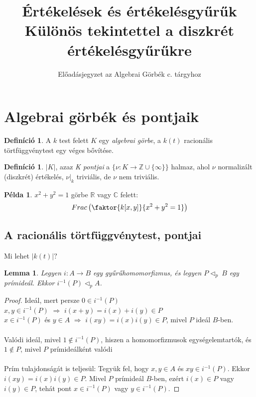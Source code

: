 \documentclass[11pt,a4paper]{article}
\title{Értékelések és értékelésgyűrűk\\
\large Különös tekintettel a diszkrét értékelésgyűrűkre}
\author{Előadásjegyzet az Algebrai Görbék c. tárgyhoz}
\date{}
\newtheorem{lemma}[tetel]{Lemma}
\theoremstyle{definition}
\newtheorem{definicio}[tetel]{Definíció}
\newtheorem{pelda}[tetel]{Példa}
\begin{document}
\section{Algebrai görbék és pontjaik}

\begin{definicio}
    A $k$ test felett $K$ egy \emph{algebrai görbe}, a $k(t)$ racionális törtfüggvénytest egy véges bővítése.
\end{definicio}

\begin{definicio}
   $|K|$, azaz \emph{K pontjai} a $\{ \nu : K \rightarrow \mathbb{Z} \cup \{\infty\}\}$ halmaz, ahol $\nu$ normalizált (diszkrét) értékelés, $\nu|_k$ triviális, de $\nu$ nem triviális.
\end{definicio}

\begin{pelda}
    $x^2+y^2=1$ görbe $\mathbb{R}$ vagy $\mathbb{C}$ felett:
    $$Frac\left (\faktor {k[x,y]}{x^2+y^2=1}\right)$$
\end{pelda}

\subsection{A racionális törtfüggvénytest, pontjai}

Mi lehet $|k(t)|?$

\begin{lemma}
Legyen $i: A \to B$ egy gyűrűhomomorfizmus, és legyen $P \vartriangleleft _p~ B$ egy prímideál. Ekkor $i^{-1}(P) \vartriangleleft _p A$.
\end{lemma}

\begin{proof}
Ideál, mert persze $0 \in i^{-1}(P)$
\\
$x, y \in i^{-1}(P)$ $\Rightarrow$ $i(x+y) = i(x) + i(y) \in P$
\\
$x \in i^{-1}(P)$ és $y \in A$ $\Rightarrow$ $i(xy) = i(x)i(y) \in P$, mivel $P$ ideál $B$-ben.
\\~\\
Valódi ideál, mivel $1 \notin i^{-1}(P)$, hiszen a homomorfizmusok egységelemtartók, és $1 \notin P$, mivel $P$ prímideálként valódi
\\~\\
Prím tulajdonságát is teljesül: Tegyük fel, hogy $x, y \in A$ és $xy \in i^{-1}(P)$. Ekkor $i(xy) = i(x)i(y) \in P$. Mivel $P$ prímideál $B$-ben, ezért $i(x) \in P$ vagy $i(y) \in P$, tehát pont $x \in i^{-1}(P)$ vagy $y \in i^{-1}(P)$.
\end{proof}
\end{document}
